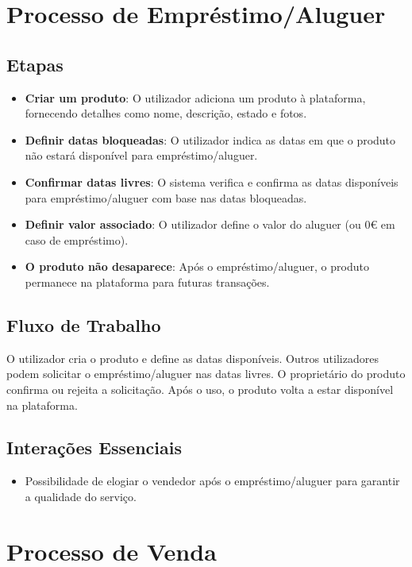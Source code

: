 \documentclass[a4paper, 12pt]{article} %
\begin{document}

\section{Processo de Empréstimo/Aluguer}

\subsection{Etapas}
\begin{itemize}
    \item \textbf{Criar um produto}: O utilizador adiciona um produto à plataforma, fornecendo detalhes como nome, descrição, estado e fotos.
    \item \textbf{Definir datas bloqueadas}: O utilizador indica as datas em que o produto não estará disponível para empréstimo/aluguer.
    \item \textbf{Confirmar datas livres}: O sistema verifica e confirma as datas disponíveis para empréstimo/aluguer com base nas datas bloqueadas.
    \item \textbf{Definir valor associado}: O utilizador define o valor do aluguer (ou 0€ em caso de empréstimo).
    \item \textbf{O produto não desaparece}: Após o empréstimo/aluguer, o produto permanece na plataforma para futuras transações.
\end{itemize}

\subsection{Fluxo de Trabalho}
O utilizador cria o produto e define as datas disponíveis. Outros utilizadores podem solicitar o empréstimo/aluguer nas datas livres. O proprietário do produto confirma ou rejeita a solicitação. Após o uso, o produto volta a estar disponível na plataforma.

\subsection{Interações Essenciais}
\begin{itemize}
    \item Possibilidade de elogiar o vendedor após o empréstimo/aluguer para garantir a qualidade do serviço.
\end{itemize}

\section{Processo de Venda}
\end{document}
